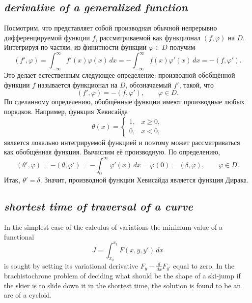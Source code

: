 \subsection*{ \textit{derivative of a generalized function}}
\begin{rusblock}
Посмотрим, что представляет собой производная обычной непрерывно дифференцируемой функции $f$, рассматриваемой как функционал $(f,\varphi)$ на $D$. Интегрируя по частям, из финитности функции $\varphi\in D$ получим
\[
(f',\varphi)=\int_{-\infty}^{\infty}f'(x)\varphi(x)\,dx
=-\int_{-\infty}^{\infty}f(x)\varphi'(x)\,dx
=-(f,\varphi').
\]
Это делает естественным следующее определение: производной обобщённой функции $f$ называется функционал на $D$, обозначаемый $f'$, такой, что
\[
(f',\varphi)=-(f,\varphi'),\qquad \varphi\in D.
\]
По сделанному определению, обобщённые функции имеют производные любых порядков. Например, функция Хевисайда
\[
\theta(x)=
\begin{cases}
1,&x\ge0,\\
0,&x<0,
\end{cases}
\]
является локально интегрируемой функцией и поэтому может рассматриваться как обобщённая функция. Вычислим её производную. По определению,
\[
(\theta',\varphi)=-(\theta,\varphi')=-\int_0^{\infty}\varphi'(x)\,dx=\varphi(0)=(\delta,\varphi),\qquad \varphi\in D.
\]
Итак, $\theta'=\delta$. Значит, производной функции Хевисайда является функция Дирака.
\end{rusblock}


\subsection*{ \textit{shortest time of traversal of a curve}}
\begin{sourcebox}
In the simplest case of the calculus of variations the minimum value of a functional
\[
J=\int_{x_0}^{x_1}F(x,y,y')\,dx
\]
is sought by setting its variational derivative $F_y-\frac{d}{dx}F_{y'}$ equal to zero. In the brachistochrone problem of deciding what should be the shape of a ski-jump if the skier is to slide down it in the shortest time, the solution is found to be an arc of a cycloid.
\end{sourcebox}

